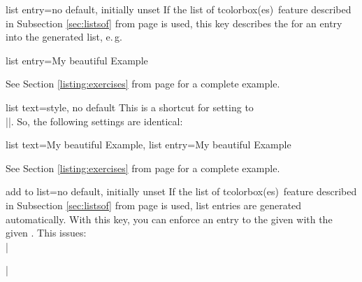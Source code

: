 \clearpage
\begin{docTcbKey}{list entry}{=}{no default, initially unset}
If the \flqq list of tcolorbox(es)\frqq\ feature described in Subsection
\ref{sec:listsof} from page \pageref{sec:listsof} is used, this key
describes the  for an entry into the generated list, e.\,g.
\begin{dispListing}
list entry={\protect\numberline{\thetcbcounter}My beautiful Example}
\end{dispListing}
See Section \ref{listing:exercises} from page \pageref{listing:exercises}
for a complete example.
\end{docTcbKey}

\begin{docTcbKey}[][doc new=2014-09-19]{list text}{=}{style, no default}
This is a shortcut for setting  to\\
|\protect\numberline{\thetcbcounter}|.
So, the following settings are identical:
\begin{dispListing}
list text={My beautiful Example},
list entry={\protect\numberline{\thetcbcounter}My beautiful Example}
\end{dispListing}
See Section \ref{listing:exercises} from page \pageref{listing:exercises}
for a complete example.
\end{docTcbKey}

\begin{docTcbKey}{add to list}{=}{no default, initially unset}
If the \flqq list of tcolorbox(es)\frqq\ feature described in Subsection
\ref{sec:listsof} from page \pageref{sec:listsof} is used, list entries are
generated automatically. With this key, you can enforce an entry to the
given  with the given .
This issues:\\
|\addcontentsline|
\end{docTcbKey}


